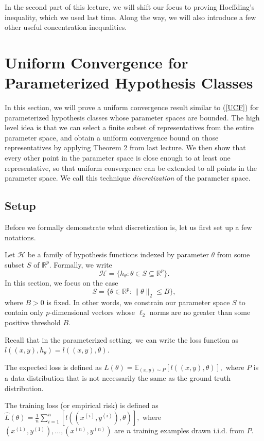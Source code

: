 \documentclass[11pt]{article}
\newcommand{\E}{\mathbb{E}}
\newcommand{\R}{\mathbb{R}}
\begin{document}
In the second part of this lecture, we will shift our focus to proving Hoeffding's inequality, which we used last time. Along the way, we will also introduce a few other useful concentration inequalities.

\section{Uniform Convergence for Parameterized Hypothesis Classes}

In this section, we will prove a uniform convergence result similar to (\ref{UCF}) for parameterized hypothesis classes whose parameter spaces are bounded. The high level idea is that we can select a finite subset of representatives from the entire parameter space, and obtain a uniform convergence bound on those representatives by applying Theorem 2 from last lecture. We then show that every other point in the parameter space is close enough to at least one representative, so that uniform convergence can be extended to all points in the parameter space. We call this technique \emph{discretization} of the parameter space.

\subsection{Setup}
Before we formally demonstrate what discretization is, let us first set up a few notations.

Let $\mathcal H$ be a family of hypothesis functions indexed by parameter $\theta$ from some subset $S$ of $\R^p$. Formally, we write $$\mathcal H = \{h_\theta: \theta \in S\subseteq \R^p \}.$$ In this section, we focus on the case $$S = \{\theta \in \R^p: \|\theta\|_2 \le B\},$$ where $B>0$ is fixed. In other words, we constrain our parameter space $S$ to contain only $p$-dimensional vectors whose $\ell_2$ norms are no greater than some positive threshold $B$. 

Recall that in the parameterized setting, we can write the loss function as $l((x, y), h_\theta) = l((x, y), \theta)$. 

The expected loss is defined as $L(\theta) = \E_{(x, y) \sim P}[l((x, y), \theta)],$ where $P$ is a data distribution that is not necessarily the same as the ground truth distribution.

The training loss (or empirical risk) is defined as $\hat L(\theta) = \frac{1}{n}\sum_{i = 1}^{n}[l((x^{(i)}, y^{(i)}), \theta)],$ where $(x^{(1)}, y^{(1)}), \ldots, (x^{(n)}, y^{(n)})$ are $n$ training examples drawn i.i.d. from $P$. 
\end{document}
